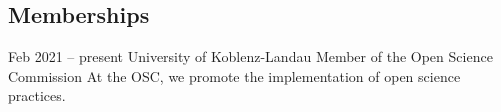 \documentclass[10pt]{FreemanCV}
\begin{document}
\begin{paracol}{2}

\section{Memberships}

\jobentry
	{Feb 2021 -- present} 
	{}
	{University of Koblenz-Landau}
	{Member of the Open Science Commission}  
	{At the OSC, we promote the implementation of open science practices.}








	
	
	

\end{paracol}
\end{document}
